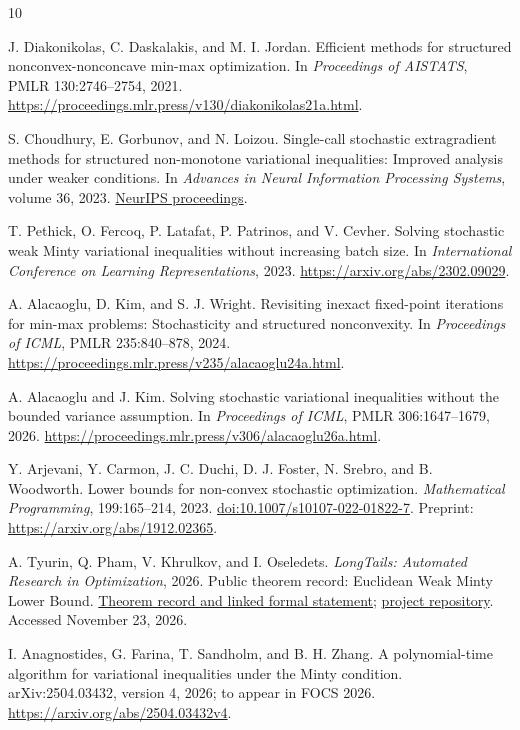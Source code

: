 \documentclass[11pt,a4paper]{article}
\theoremstyle{definition}
\theoremstyle{remark}
\begin{document}
\begin{thebibliography}{10}

J. Diakonikolas, C. Daskalakis, and M. I. Jordan.
\newblock Efficient methods for structured nonconvex-nonconcave min-max optimization.
\newblock In \emph{Proceedings of AISTATS}, PMLR 130:2746--2754, 2021.
\newblock \url{https://proceedings.mlr.press/v130/diakonikolas21a.html}.

S. Choudhury, E. Gorbunov, and N. Loizou.
\newblock Single-call stochastic extragradient methods for structured non-monotone
variational inequalities: Improved analysis under weaker conditions.
\newblock In \emph{Advances in Neural Information Processing Systems}, volume 36, 2023.
\newblock \href{https://papers.neurips.cc/paper_files/paper/2023/hash/ccf02786d28730e8311676ffa842e216-Abstract-Conference.html}{NeurIPS proceedings}.

T. Pethick, O. Fercoq, P. Latafat, P. Patrinos, and V. Cevher.
\newblock Solving stochastic weak Minty variational inequalities without increasing batch size.
\newblock In \emph{International Conference on Learning Representations}, 2023.
\newblock \url{https://arxiv.org/abs/2302.09029}.

A. Alacaoglu, D. Kim, and S. J. Wright.
\newblock Revisiting inexact fixed-point iterations for min-max problems:
Stochasticity and structured nonconvexity.
\newblock In \emph{Proceedings of ICML}, PMLR 235:840--878, 2024.
\newblock \url{https://proceedings.mlr.press/v235/alacaoglu24a.html}.

A. Alacaoglu and J. Kim.
\newblock Solving stochastic variational inequalities without the bounded variance assumption.
\newblock In \emph{Proceedings of ICML}, PMLR 306:1647--1679, 2026.
\newblock \url{https://proceedings.mlr.press/v306/alacaoglu26a.html}.

Y. Arjevani, Y. Carmon, J. C. Duchi, D. J. Foster, N. Srebro, and B. Woodworth.
\newblock Lower bounds for non-convex stochastic optimization.
\newblock \emph{Mathematical Programming}, 199:165--214, 2023.
\newblock \href{https://doi.org/10.1007/s10107-022-01822-7}{doi:10.1007/s10107-022-01822-7}.
\newblock Preprint: \url{https://arxiv.org/abs/1912.02365}.

A. Tyurin, Q. Pham, V. Khrulkov, and I. Oseledets.
\newblock \emph{LongTails: Automated Research in Optimization}, 2026.
\newblock Public theorem record: Euclidean Weak Minty Lower Bound.
\newblock \href{https://k3nfalt.github.io/longtails/results/EuclideanWeakMintyLowerBound/}{Theorem record and linked formal statement};
\href{https://github.com/k3nfalt/longtails}{project repository}.
\newblock Accessed November 23, 2026.

I. Anagnostides, G. Farina, T. Sandholm, and B. H. Zhang.
\newblock A polynomial-time algorithm for variational inequalities under the Minty condition.
\newblock arXiv:2504.03432, version 4, 2026; to appear in FOCS 2026.
\newblock \url{https://arxiv.org/abs/2504.03432v4}.

\end{thebibliography}
\end{document}
